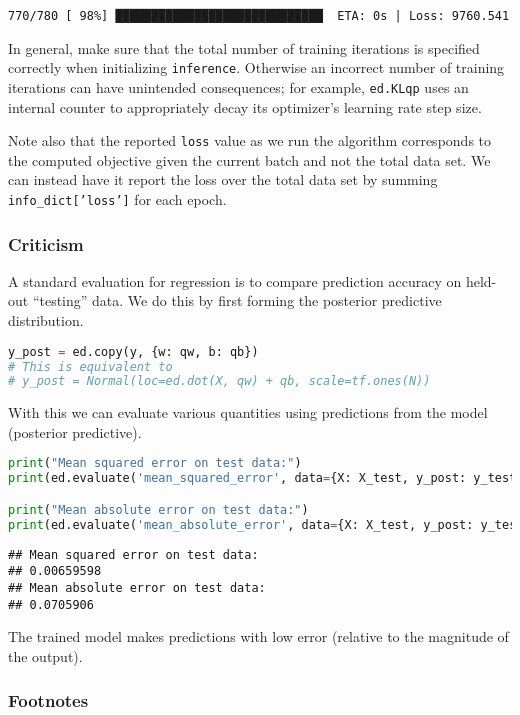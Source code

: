 \begin{lstlisting}
770/780 [ 98%] █████████████████████████████  ETA: 0s | Loss: 9760.541
\end{lstlisting}

In general, make sure that the total number of training iterations is
specified correctly when initializing \texttt{inference}. Otherwise an incorrect
number of training iterations can have unintended consequences; for example,
\texttt{ed.KLqp} uses an internal counter to appropriately decay its optimizer's
learning rate step size.

Note also that the reported \texttt{loss} value as we run the
algorithm corresponds to the computed objective given the current
batch and not the total data set. We can instead have it report
the loss over the total data set by summing \texttt{info\_dict['loss']}
for each epoch.

\subsubsection{Criticism}

A standard evaluation for regression is to compare prediction accuracy on
held-out ``testing'' data. We do this by first forming the posterior predictive
distribution.
\begin{lstlisting}[language=Python]
y_post = ed.copy(y, {w: qw, b: qb})
# This is equivalent to
# y_post = Normal(loc=ed.dot(X, qw) + qb, scale=tf.ones(N))
\end{lstlisting}

With this we can evaluate various quantities using predictions from
the model (posterior predictive).
\begin{lstlisting}[language=Python]
print("Mean squared error on test data:")
print(ed.evaluate('mean_squared_error', data={X: X_test, y_post: y_test}))

print("Mean absolute error on test data:")
print(ed.evaluate('mean_absolute_error', data={X: X_test, y_post: y_test}))
\end{lstlisting}

\begin{lstlisting}
## Mean squared error on test data:
## 0.00659598
## Mean absolute error on test data:
## 0.0705906
\end{lstlisting}

The trained model makes predictions with low error
(relative to the magnitude of the output).

\subsubsection{Footnotes}

